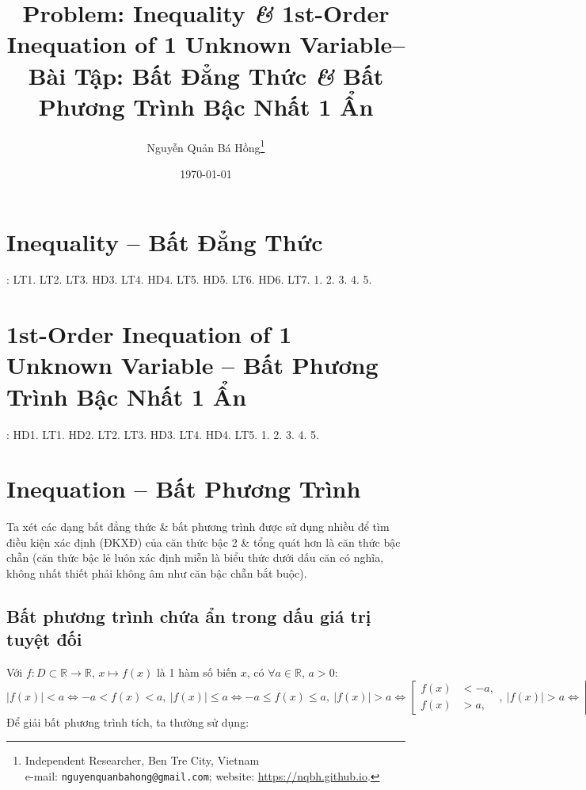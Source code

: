 \documentclass{article}
\title{Problem: Inequality {\it\&} 1st-Order Inequation of 1 Unknown Variable-- Bài Tập: Bất Đẳng Thức {\it\&} Bất Phương Trình Bậc Nhất 1 Ẩn}
\author{Nguyễn Quản Bá Hồng\footnote{Independent Researcher, Ben Tre City, Vietnam\\e-mail: \texttt{nguyenquanbahong@gmail.com}; website: \url{https://nqbh.github.io}.}}
\date{\today}
\begin{document}
\maketitle
\tableofcontents


\section{Inequality -- Bất Đẳng Thức}
\cite[\S1, pp. 28--34]{SGK_Toan_9_Canh_Dieu_tap_1}: LT1. LT2. LT3. HD3. LT4. HD4. LT5. HD5. LT6. HD6. LT7. 1. 2. 3. 4. 5.


\section{1st-Order Inequation of 1 Unknown Variable -- Bất Phương Trình Bậc Nhất 1 Ẩn}
\cite[\S2, pp. 35--41]{SGK_Toan_9_Canh_Dieu_tap_1}: HD1. LT1. HD2. LT2. LT3. HD3. LT4. HD4. LT5. 1. 2. 3. 4. 5.


\section{Inequation -- Bất Phương Trình}
Ta xét các dạng bất đẳng thức \& bất phương trình được sử dụng nhiều để tìm điều kiện xác định (ĐKXĐ) của căn thức bậc 2 \& tổng quát hơn là căn thức bậc chẵn (căn thức bậc lẻ luôn xác định miễn là biểu thức dưới dấu căn có nghĩa, không nhất thiết phải không âm như căn bậc chẵn bắt buộc).

\subsection{Bất phương trình chứa ẩn trong dấu giá trị tuyệt đối}
Với $f:D\subset\mathbb{R}\to\mathbb{R}$, $x\mapsto f(x)$ là 1 hàm số biến $x$, có $\forall a\in\mathbb{R}$, $a > 0$:
\begin{equation*}
	\boxed{|f(x)| < a\Leftrightarrow -a < f(x) < a,\ |f(x)|\le a\Leftrightarrow -a\le f(x)\le a,\ |f(x)| > a\Leftrightarrow\left[\begin{split}
			f(x) &< -a,\\
			f(x) &> a,
		\end{split}\right.,\ |f(x)| > a\Leftrightarrow\left[\begin{split}
			f(x) &\le -a,\\
			f(x) &\ge a.
		\end{split}\right.}
\end{equation*}
Để giải bất phương trình tích, ta thường sử dụng:
\end{document}
